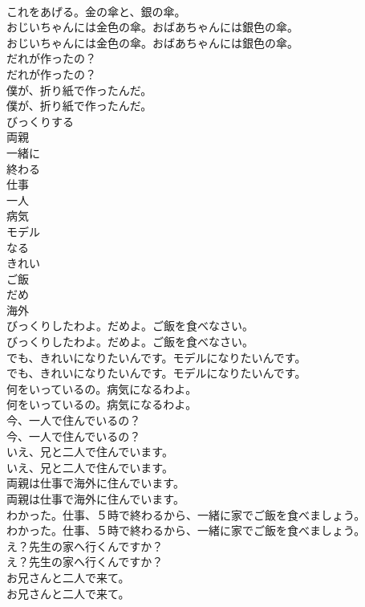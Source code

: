 \documentclass[8pt]{extreport}
\begin{document}
\begin{CJK}{UTF8}{min}
\\	これをあげる。金の傘と、銀の傘。 
\\	おじいちゃんには金色の傘。おばあちゃんには銀色の傘。	
\\	おじいちゃんには金色の傘。おばあちゃんには銀色の傘。 
\\	だれが作ったの？	
\\	だれが作ったの？ 
\\	僕が、折り紙で作ったんだ。	
\\	僕が、折り紙で作ったんだ。 
\\	びっくりする
\\	両親
\\	一緒に
\\	終わる
\\	仕事
\\	一人
\\	病気
\\	モデル
\\	なる
\\	きれい
\\	ご飯
\\	だめ
\\	海外
\\	びっくりしたわよ。だめよ。ご飯を食べなさい。	
\\	びっくりしたわよ。だめよ。ご飯を食べなさい。 
\\	でも、きれいになりたいんです。モデルになりたいんです。	
\\	でも、きれいになりたいんです。モデルになりたいんです。 
\\	何をいっているの。病気になるわよ。	
\\	何をいっているの。病気になるわよ。 
\\	今、一人で住んでいるの？	
\\	今、一人で住んでいるの？ 
\\	いえ、兄と二人で住んでいます。	
\\	いえ、兄と二人で住んでいます。 
\\	両親は仕事で海外に住んでいます。	
\\	両親は仕事で海外に住んでいます。 
\\	わかった。仕事、５時で終わるから、一緒に家でご飯を食べましょう。	
\\	わかった。仕事、５時で終わるから、一緒に家でご飯を食べましょう。 
\\	え？先生の家へ行くんですか？	
\\	え？先生の家へ行くんですか？ 
\\	お兄さんと二人で来て。	
\\	お兄さんと二人で来て。 

\end{CJK}
\end{document}

